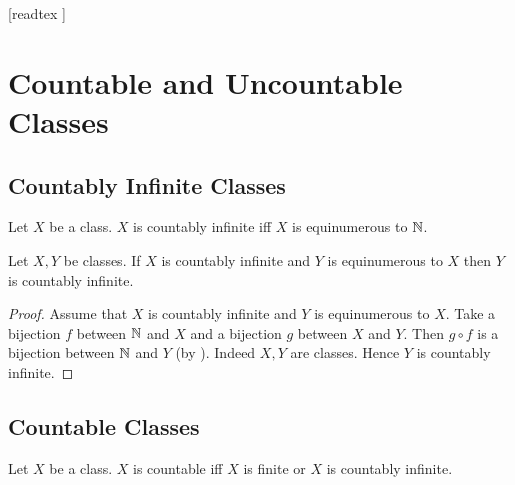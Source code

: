 \documentclass[10pt]{article}
\begin{document}
  \begin{imports}
    \begin{forthel}
      [readtex ]
    \end{forthel}
  \end{imports}


  \section*{Countable and Uncountable Classes}


  \subsection*{Countably Infinite Classes}

  \begin{forthel}
    \begin{definition}[id=FOUNDATIONS_14_6249029537103872,printid]
      Let $X$ be a class.
      $X$ is countably infinite iff $X$ is equinumerous to $\mathbb{N}$.
    \end{definition}
  \end{forthel}

  \begin{forthel}
    \begin{proposition}[id=FOUNDATIONS_14_803449379749888,printid]
      Let $X, Y$ be classes.
      If $X$ is countably infinite and $Y$ is equinumerous to $X$ then $Y$ is countably infinite.
    \end{proposition}
    \begin{proof}
      Assume that $X$ is countably infinite and $Y$ is equinumerous to $X$.
      Take a bijection $f$ between $\mathbb{N}$ and $X$ and a bijection $g$ between $X$ and $Y$.
      Then $g \circ f$ is a bijection between $\mathbb{N}$ and $Y$ (by ).
      Indeed $X, Y$ are classes.
      Hence $Y$ is countably infinite.
    \end{proof}
  \end{forthel}


  \subsection*{Countable Classes}

  \begin{forthel}
    \begin{definition}[id=FOUNDATIONS_14_5412969443753984,printid]
      Let $X$ be a class.
      $X$ is countable iff $X$ is finite or $X$ is countably infinite.
    \end{definition}
  \end{forthel}
\end{document}
